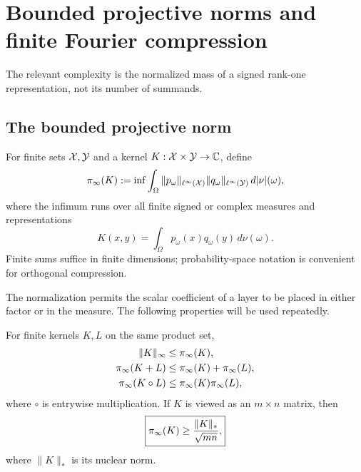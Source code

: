\section{Bounded projective norms and finite Fourier compression}
\label{sec:tpc36-projective-toolkit}

The relevant complexity is the normalized mass of a signed rank-one
representation, not its number of summands.

\subsection{The bounded projective norm}

\begin{definition}
\label{def:tpc36-projective-norm}
For finite sets \(\mathcal X,\mathcal Y\) and a kernel
\(K:\mathcal X\times\mathcal Y\to\mathbb C\), define
\begin{equation}
 \pi_{\infty}(K)
 :=\inf\int_\Omega
 \|p_\omega\|_{\ell^\infty(\mathcal X)}
 \|q_\omega\|_{\ell^\infty(\mathcal Y)}\,d|\nu|(\omega),
 \label{eq:tpc36-projective-norm}
\end{equation}
where the infimum runs over all finite signed or complex measures and
representations
\begin{equation}
 K(x,y)=\int_\Omega p_\omega(x)q_\omega(y)\,d\nu(\omega).
 \label{eq:tpc36-projective-representation}
\end{equation}
Finite sums suffice in finite dimensions; probability-space notation is
convenient for orthogonal compression.
\end{definition}

The normalization permits the scalar coefficient of a layer to be placed
in either factor or in the measure.  The following properties will be
used repeatedly.

\begin{lemma}
\label{lem:tpc36-projective-calculus}
For finite kernels \(K,L\) on the same product set,
\begin{align}
 \|K\|_\infty&\le\pi_{\infty}(K),
 \label{eq:tpc36-entry-lower}\\
 \pi_{\infty}(K+L)&\le\pi_{\infty}(K)+\pi_{\infty}(L),
 \label{eq:tpc36-triangle}\\
 \pi_{\infty}(K\circ L)&\le\pi_{\infty}(K)\pi_{\infty}(L),
 \label{eq:tpc36-schur-submultiplicativity}
\end{align}
where \(\circ\) is entrywise multiplication.  If \(K\) is viewed as an
\(m\times n\) matrix, then
\begin{equation}
 \boxed{
 \pi_{\infty}(K)\ge\frac{\|K\|_*}{\sqrt{mn}},}
 \label{eq:tpc36-nuclear-lower}
\end{equation}
where \(\|K\|_*\) is its nuclear norm.
\end{lemma}

